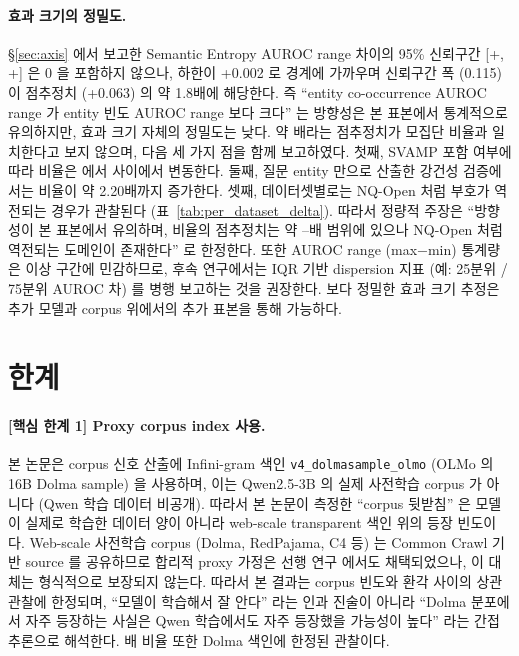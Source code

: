 \documentclass[oneside,ko,under]{snuthesis}
\begin{document}
\paragraph{효과 크기의 정밀도.}
§\ref{sec:axis} 에서 보고한 Semantic Entropy AUROC range 차이의 95\% 신뢰구간 [+\HeadlinePairMinusFreqSECIlow{}, +\HeadlinePairMinusFreqSECIhigh{}] 은 0 을 포함하지 않으나, 하한이 +0.002 로 경계에 가까우며 신뢰구간 폭 (0.115) 이 점추정치 (+0.063) 의 약 1.8배에 해당한다. 즉 ``entity co-occurrence AUROC range 가 entity 빈도 AUROC range 보다 크다'' 는 방향성은 본 표본에서 통계적으로 유의하지만, 효과 크기 자체의 정밀도는 낮다. 약 \HeadlineEntityPairOverEntityFreqRatio{}배라는 점추정치가 모집단 비율과 일치한다고 보지 않으며, 다음 세 가지 점을 함께 보고하였다. 첫째, SVAMP 포함 여부에 따라 비율은 \HeadlineSVAMPExclSERatio{} 에서 \HeadlineEntityPairOverEntityFreqRatio{} 사이에서 변동한다. 둘째, 질문 entity 만으로 산출한 강건성 검증에서는 비율이 약 2.20배까지 증가한다. 셋째, 데이터셋별로는 NQ-Open 처럼 부호가 역전되는 경우가 관찰된다 (표~\ref{tab:per_dataset_delta}). 따라서 정량적 주장은 ``방향성이 본 표본에서 유의하며, 비율의 점추정치는 약 \HeadlineRatioRangeLow{}--\HeadlineRatioRangeHigh{}배 범위에 있으나 NQ-Open 처럼 역전되는 도메인이 존재한다'' 로 한정한다. 또한 AUROC range (max$-$min) 통계량은 이상 구간에 민감하므로, 후속 연구에서는 IQR 기반 dispersion 지표 (예: 25분위 / 75분위 AUROC 차) 를 병행 보고하는 것을 권장한다. 보다 정밀한 효과 크기 추정은 추가 모델과 corpus 위에서의 추가 표본을 통해 가능하다.

\section{한계}\label{sec:limitations}

\paragraph{[핵심 한계 1] Proxy corpus index 사용.}
본 논문은 corpus 신호 산출에 Infini-gram 색인 \texttt{v4\_dolmasample\_olmo} (OLMo 의 16B Dolma sample) 을 사용하며, 이는 Qwen2.5-3B 의 실제 사전학습 corpus 가 아니다 (Qwen 학습 데이터 비공개). 따라서 본 논문이 측정한 ``corpus 뒷받침'' 은 모델이 실제로 학습한 데이터 양이 아니라 web-scale transparent 색인 위의 등장 빈도이다. Web-scale 사전학습 corpus (Dolma, RedPajama, C4 등) 는 Common Crawl 기반 source 를 공유하므로 합리적 proxy 가정은 선행 연구\cite{qucorag} 에서도 채택되었으나, 이 대체는 형식적으로 보장되지 않는다. 따라서 본 결과는 corpus 빈도와 환각 사이의 상관 관찰에 한정되며, ``모델이 학습해서 잘 안다'' 라는 인과 진술이 아니라 ``Dolma 분포에서 자주 등장하는 사실은 Qwen 학습에서도 자주 등장했을 가능성이 높다'' 라는 간접 추론으로 해석한다. \HeadlineEntityPairOverEntityFreqRatio{}배 비율 또한 Dolma 색인에 한정된 관찰이다.
\end{document}
